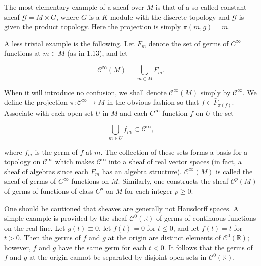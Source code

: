 \begin{examples}\label{thm:5.2}
The most elementary example of a sheaf over $M$ is that of a so-called constant sheaf $\mathcal{G} = M \times G$, where $G$ is a $K$-module with the discrete topology and $\mathcal{G}$ is given the product topology. Here the projection is simply $\pi(m,g) = m$. 

A less trivial example is the following. Let $\bar{F}_{m}$ denote the set of germs of $C^{\infty}$ functions at $m\in M$ (as in 1.13), and let

\begin{equation}
\tag{1}\label{eq:5.2:1}
\mathcal{C}^{\infty}(M)=\bigcup_{m\in M}\bar{F}_{m}.
\end{equation}

When it will introduce no confusion, we shall denote $\mathcal{C}^{\infty}(M)$ simply by $\mathcal{C}^{\infty}$. We define the projection $\pi\colon \mathcal{C}^{\infty} \to M$ in the obvious fashion so that $f \in \bar{F}_{\pi(f)}$. Associate with each open set $U$ in $M$ and each $C^{\infty}$ function $f$ on $U$ the set

\[
\bigcup_{m\in U}f_{m}\subset\mathcal{C}^{\infty},
\]

where  $ f_m $ is the germ of  $ f $ at  $ m $. The collection of these sets forms a basis for a topology on  $ \mathcal{C}^\infty $ which makes  $ \mathcal{C}^\infty $ into a sheaf of real vector spaces (in fact, a sheaf of algebras since each  $ \bar{F}_m $ has an algebra structure).  $ \mathcal{C}^\infty(M) $ is called the sheaf of germs of  $ C^\infty $ functions on  $ M $. Similarly, one constructs the sheaf  $ \mathcal{C}^p(M) $ of germs of functions of class  $ C^p $ on  $ M $ for each integer  $ p \geq 0 $. 

\end{examples}

\begin{remarks}\label{thm:5.3}
One should be cautioned that sheaves are generally not Hausdorff spaces. A simple example is provided by the sheaf  $ \mathcal{C}^0(\mathbb{R}) $ of germs of continuous functions on the real line. Let  $ g(t) \equiv 0 $, let  $ f(t) = 0 $ for  $ t \leq 0 $, and let  $ f(t) = t $ for  $ t > 0 $. Then the germs of  $ f $ and  $ g $ at the origin are distinct elements of  $ \mathcal{C}^0(\mathbb{R}) $; however,  $ f $ and  $ g $ have the same germ for each  $ t < 0 $. It follows that the germs of  $ f $ and  $ g $ at the origin cannot be separated by disjoint open sets in  $ \mathcal{C}^0(\mathbb{R}) $.

\end{remarks}

